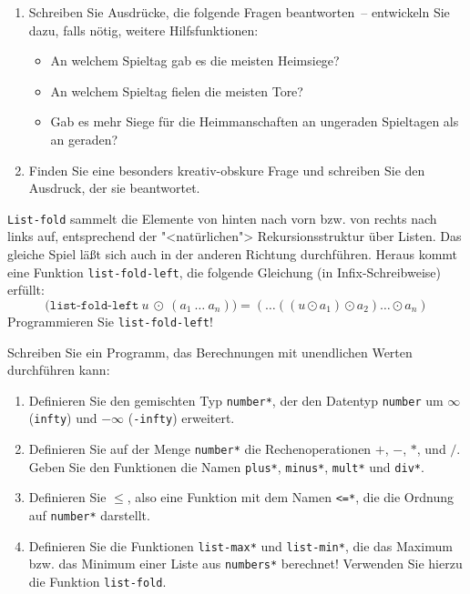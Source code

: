 \begin{aufgabe}
\begin{enumerate}
  \item Schreiben Sie Ausdrücke, die folgende Fragen beantworten~--
  entwickeln Sie dazu, falls nötig, weitere Hilfsfunktionen:
  \begin{itemize}
    \item An welchem Spieltag gab es die meisten Heimsiege?
    \item An welchem Spieltag fielen die meisten Tore?
    \item Gab es mehr Siege für die Heimmanschaften an ungeraden Spieltagen als an
      geraden?
    \end{itemize}
    
  \item Finden Sie eine besonders
    kreativ-obskure Frage und schreiben Sie den Ausdruck, der sie
    beantwortet.
\end{enumerate} 

\end{aufgabe}

\begin{aufgabe}
  \texttt{List-fold} sammelt die Elemente von hinten nach vorn bzw.
  von rechts nach links auf, entsprechend der "<natürlichen">
  Rekursionsstruktur über Listen.  Das gleiche Spiel läßt sich auch in
  der anderen Richtung durchführen.  Heraus kommt eine Funktion
  \texttt{list-fold-left}, die folgende Gleichung (in
  Infix-Schreibweise) erfüllt:
  \begin{displaymath}
    \texttt{(list-fold-left}~u~\odot~(a_1~\ldots~a_n)\texttt{)}
    = (\ldots((u\odot a_1)\odot a_2)\ldots\odot a_n)
  \end{displaymath}
  Programmieren Sie \texttt{list-fold-left}!
\end{aufgabe}


\begin{aufgabe}
  Schreiben Sie ein Programm, das Berechnungen
  mit unendlichen Werten durchführen kann:
  
  \begin{enumerate}
  \item Definieren Sie den gemischten Typ \texttt{number*}, der den
    Datentyp \texttt{number} um $\infty$ (\texttt{infty}) und $- \infty$
    (\texttt{-infty}) erweitert.
  \item Definieren Sie auf der Menge \texttt{number*} die
    Rechenoperationen $+$, $-$, $*$, und $/$.  Geben Sie den Funktionen
    die Namen \texttt{plus*}, \texttt{minus*}, \texttt{mult*} und
    \texttt{div*}.
  \item Definieren Sie $\leq$, also eine Funktion mit dem
    Namen \texttt{<=*}, die die Ordnung auf \texttt{number*} darstellt.
  \item Definieren Sie die Funktionen \texttt{list-max*} und
    \texttt{list-min*}, die das Maximum bzw. das Minimum einer Liste 
    aus \texttt{numbers*} berechnet!  Verwenden Sie hierzu die Funktion \texttt{list-fold}.
  \end{enumerate}
\end{aufgabe}

